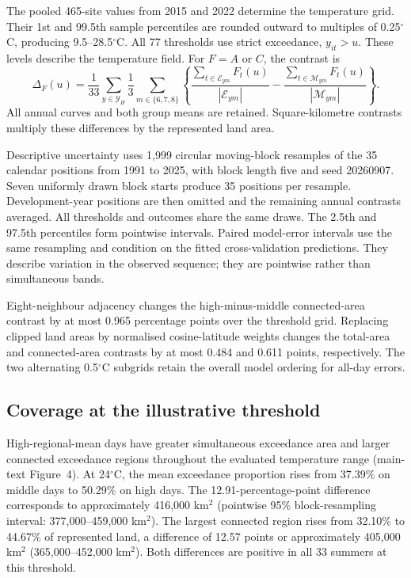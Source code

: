 The pooled 465-site values from 2015 and 2022 determine the temperature grid.
Their 1st and 99.5th sample percentiles are rounded outward to multiples of
0.25$^\circ$C, producing 9.5--28.5$^\circ$C. All 77 thresholds use strict
exceedance, $y_{it}>u$. These levels describe the temperature field.
For $F=A$ or $C$, the contrast is
\[
 \Delta_F(u)=\frac{1}{33}\sum_{y\in\mathcal Y_H}
 \frac{1}{3}\sum_{m\in\{6,7,8\}}
 \left\{\frac{\sum_{t\in\mathcal E_{ym}}F_t(u)}{|\mathcal E_{ym}|}
 -\frac{\sum_{t\in\mathcal M_{ym}}F_t(u)}{|\mathcal M_{ym}|}\right\}.
\]
All annual curves and both group means are retained. Square-kilometre
contrasts multiply these differences by the represented land area.

Descriptive uncertainty uses 1,999 circular moving-block resamples of the
35 calendar positions from 1991 to 2025, with block length five and seed
20260907. Seven uniformly drawn block starts produce 35 positions per
resample. Development-year positions are then omitted and the remaining
annual contrasts averaged. All thresholds and outcomes share the same draws.
The 2.5th and 97.5th percentiles form pointwise intervals. Paired model-error
intervals use the same resampling and condition on the fitted
cross-validation predictions. They describe variation in the observed
sequence; they are pointwise rather than simultaneous bands.

Eight-neighbour adjacency changes the high-minus-middle connected-area
contrast by at most 0.965 percentage points over the threshold grid.
Replacing clipped land areas by normalised cosine-latitude weights changes
the total-area and connected-area contrasts by at most 0.484 and 0.611
points, respectively. The two alternating 0.5$^\circ$C subgrids retain the
overall model ordering for all-day errors.

\subsection{Coverage at the illustrative threshold}

High-regional-mean days have greater simultaneous exceedance area and larger
connected exceedance regions throughout the evaluated temperature range
(main-text Figure~4). At 24$^\circ$C, the mean exceedance
proportion rises from 37.39\% on middle days to 50.29\% on high days. The
12.91-percentage-point difference corresponds to approximately
416,000 km$^2$ (pointwise 95\% block-resampling interval:
377,000--459,000 km$^2$). The largest connected region rises from 32.10\%
to 44.67\% of represented land, a difference of 12.57 points or approximately
405,000 km$^2$ (365,000--452,000 km$^2$). Both differences are positive in all
33 summers at this threshold.


